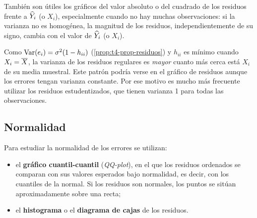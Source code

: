 También son útiles los gráficos del valor absoluto o del cuadrado de los residuos frente a
$\widehat{Y}_i$ (o $X_i$), especialmente cuando no hay muchas observaciones: si la varianza no es
homogénea, la magnitud de los residuos, independientemente de su signo, cambia con el valor de
$\widehat{Y}_i$ (o $X_i$).

\begin{nota}
  Como $\operatorname{Var}(e_i)=\sigma^2(1-h_{ii})$ (\cref{prop:t4-prop-residuos}) y $h_{ii}$ es mínimo cuando
  $X_i=\overline{X}$, la varianza de los residuos regulares es \emph{mayor} cuanto más cerca está
  $X_i$ de su media muestral.%
   Este patrón podría verse en el gráfico de residuos aunque los errores
  tengan varianza constante. Por ese motivo es mucho más frecuente utilizar los residuos
  estudentizados, que tienen varianza 1 para todas las observaciones.
\end{nota}

\subsection{Normalidad}

Para estudiar la normalidad de los errores se utilizan:
\begin{itemize}
  \item el \textbf{gráfico cuantil-cuantil} (\emph{QQ-plot}), en el que los residuos ordenados se
    comparan con sus valores esperados bajo normalidad, es decir, con los cuantiles de la normal.
    Si los residuos son normales, los puntos se sitúan aproximadamente sobre una recta;
  \item el \textbf{histograma} o el \textbf{diagrama de cajas} de los residuos.
\end{itemize}

